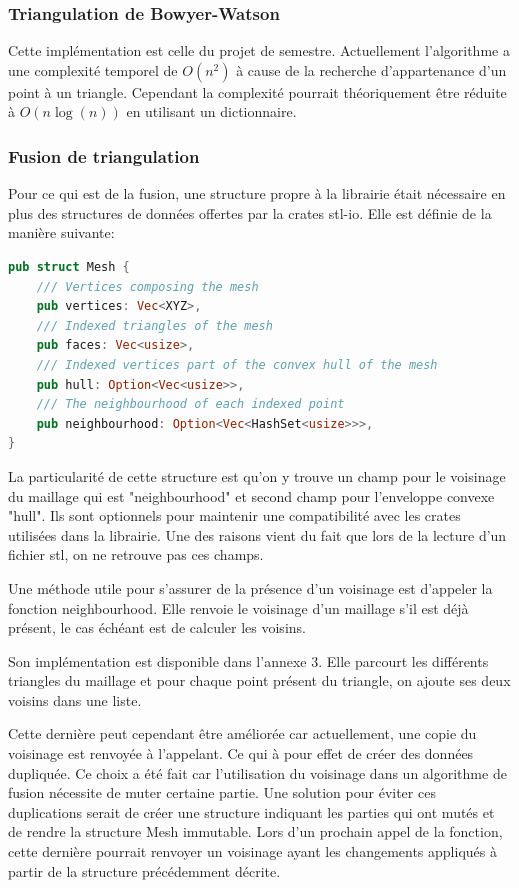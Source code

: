\subsubsection{Triangulation de Bowyer-Watson}

Cette implémentation est celle du projet de semestre. 
Actuellement l'algorithme a une complexité temporel de $O(n^2)$ à cause de la 
recherche d'appartenance d'un point à un triangle. Cependant la complexité
pourrait théoriquement être réduite à $O(n \log(n))$ en
utilisant un dictionnaire.

\subsubsection{Fusion de triangulation}

Pour ce qui est de la fusion, une structure propre à la librairie était nécessaire en plus des structures de données offertes par la crates stl-io.
Elle est définie de la manière suivante:

\begin{lstlisting}[language=Rust, style=boxed]
pub struct Mesh {
    /// Vertices composing the mesh
    pub vertices: Vec<XYZ>,
    /// Indexed triangles of the mesh
    pub faces: Vec<usize>,
    /// Indexed vertices part of the convex hull of the mesh
    pub hull: Option<Vec<usize>>,
    /// The neighbourhood of each indexed point
    pub neighbourhood: Option<Vec<HashSet<usize>>>,
}
\end{lstlisting}

La particularité de cette structure est qu'on y trouve un champ pour le voisinage du maillage qui est "neighbourhood" et second champ pour l'enveloppe convexe "hull".
Ils sont optionnels pour maintenir une compatibilité avec les crates utilisées dans la librairie.
Une des raisons vient du fait que lors de la lecture d'un fichier \gls{stl}, on ne retrouve pas ces champs. 

Une méthode utile pour s'assurer de la présence d'un voisinage est d'appeler la fonction neighbourhood.
Elle renvoie le voisinage d'un maillage s'il est déjà présent, le cas échéant est de calculer les voisins.

Son implémentation est disponible dans l'annexe 3. 
Elle parcourt les différents triangles du maillage et pour chaque point présent du triangle, on ajoute ses deux voisins dans une liste.

Cette dernière peut cependant
être améliorée car actuellement, une copie du voisinage est renvoyée à
l'appelant. Ce qui à pour effet de créer des données dupliquée. Ce choix a été
fait car l'utilisation du voisinage dans un algorithme de fusion nécessite de
muter certaine partie. Une solution pour éviter ces duplications serait de créer
une structure indiquant les parties qui ont mutés et de rendre la structure Mesh
immutable. Lors d'un prochain appel de la fonction, cette dernière pourrait
renvoyer un voisinage ayant les changements appliqués à partir de la structure
précédemment décrite.  

